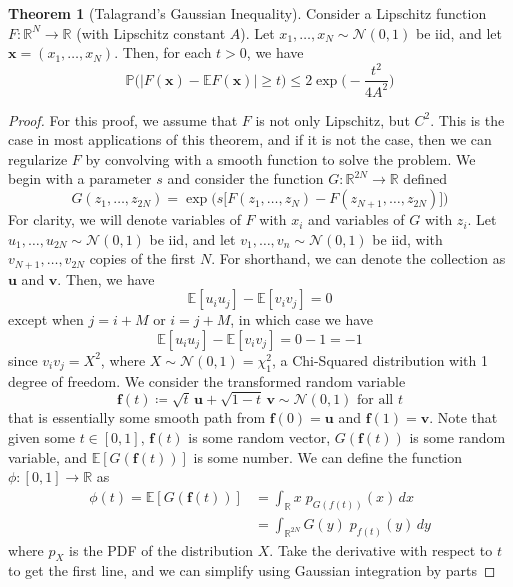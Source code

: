 \documentclass{article}
\theoremstyle{definition}
\newtheorem{theorem}{Theorem}[section]
\theoremstyle{remark}
\theoremstyle{definition}
\begin{document}
  \begin{theorem}[Talagrand's Gaussian Inequality]
  Consider a Lipschitz function $F: \mathbb{R}^N \longrightarrow \mathbb{R}$ (with Lipschitz constant $A$). Let $x_1, \ldots, x_N \sim \mathcal{N}(0, 1)$ be iid, and let $\mathbf{x} = (x_1, \ldots, x_N)$. Then, for each $t > 0$, we have 
  \[\mathbb{P} \big( | F(\mathbf{x}) - \mathbb{E} F(\mathbf{x}) | \geq t \big) \leq 2 \exp \bigg(- \frac{t^2}{4A^2} \bigg)\]
  \end{theorem}
  \begin{proof}
  For this proof, we assume that $F$ is not only Lipschitz, but $C^2$. This is the case in most applications of this theorem, and if it is not the case, then we can regularize $F$ by convolving with a smooth function to solve the problem. We begin with a parameter $s$ and consider the function $G: \mathbb{R}^{2N} \longrightarrow \mathbb{R}$ defined 
  \[G(z_1, \ldots, z_{2N}) = \exp \Big( s \big[ F ( z_1, \ldots, z_N) - F(z_{N+1}, \ldots, z_{2N}) \big] \Big)\]
  For clarity, we will denote variables of $F$ with $x_i$ and variables of $G$ with $z_i$. Let $u_1, \ldots, u_{2N} \sim \mathcal{N}(0, 1)$ be iid, and let $v_1, \ldots, v_n \sim \mathcal{N}(0, 1)$ be iid, with $v_{N+1}, \ldots, v_{2N}$ copies of the first $N$. For shorthand, we can denote the collection as $\mathbf{u}$ and $\mathbf{v}$. Then, we have 
  \[\mathbb{E} [u_i u_j] - \mathbb{E}[ v_i v_j] = 0\]
  except when $j = i + M$ or $i = j + M$, in which case we have 
  \[\mathbb{E} [u_i u_j] - \mathbb{E}[ v_i v_j] = 0 - 1 = -1\]
  since $v_i v_j = X^2$, where $X \sim \mathcal{N}(0, 1) = \chi^2_1$, a Chi-Squared distribution with 1 degree of freedom. We consider the transformed random variable
  \[\mathbf{f}(t) \coloneqq \sqrt{t} \, \mathbf{u} + \sqrt{1 - t} \, \mathbf{v} \sim \mathcal{N}(0, 1) \text{ for all } t\]
  that is essentially some smooth path from $\mathbf{f}(0) = \mathbf{u}$ and $\mathbf{f}(1) = \mathbf{v}$. Note that given some $t \in [0, 1]$, $\mathbf{f}(t)$ is some random vector, $G ( \mathbf{f}(t))$ is some random variable, and $\mathbb{E}[ G(\mathbf{f}(t))]$ is some number. We can define the function $\phi: [0, 1] \longrightarrow \mathbb{R}$ as 
  \begin{align*}
      \phi(t) = \mathbb{E} [G (\mathbf{f}(t))] & = \int_\mathbb{R} x \; p_{G(f(t))} (x) \,dx \\
      & = \int_{\mathbb{R}^{2N}} G(y) \; p_{f(t)} (y) \,dy 
  \end{align*}
  where $p_X$ is the PDF of the distribution $X$. Take the derivative with respect to $t$ to get the first line, and we can simplify using Gaussian integration by parts 

\end{proof}
\end{document}
